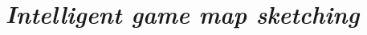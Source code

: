 \documentclass[a4paper,12pt]{report}
\title{
\HRule \\
\textsc{\doctitle} \\
	 \small{\textsl{Intelligent game map sketching}}
\HRule\\
\large{\docplace}
}
\author{\docauthor}
\date{\docdate}
\newcommand{\HRule}{\rule{\linewidth}{0.5mm}}
\begin{document}
\begin{titlepage}
\maketitle
{}
\pagestyle{empty}
\vspace{70 mm}
\end{titlepage}

\tableofcontents
{}
\newpage







\newpage

 
\end{document}
